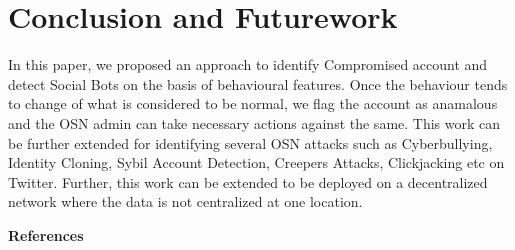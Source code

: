\documentclass[conference]{IEEEtran}
\begin{document}
\section{Conclusion and Futurework}

In this paper, we proposed an approach to identify Compromised account and detect Social Bots on the basis of behavioural features. 
Once the behaviour tends to change of what is considered to be normal, we flag the account as anamalous and the OSN admin can 
take necessary actions against the same. 
This work can be further extended for identifying several OSN attacks such as Cyberbullying, Identity Cloning, 
Sybil Account Detection, Creepers Attacks, Clickjacking etc on Twitter. Further, this work can be extended to 
be deployed on a decentralized network where the data is not centralized at one location.

\begin{center}
\textbf{References}
\end{center}
\end{document}
